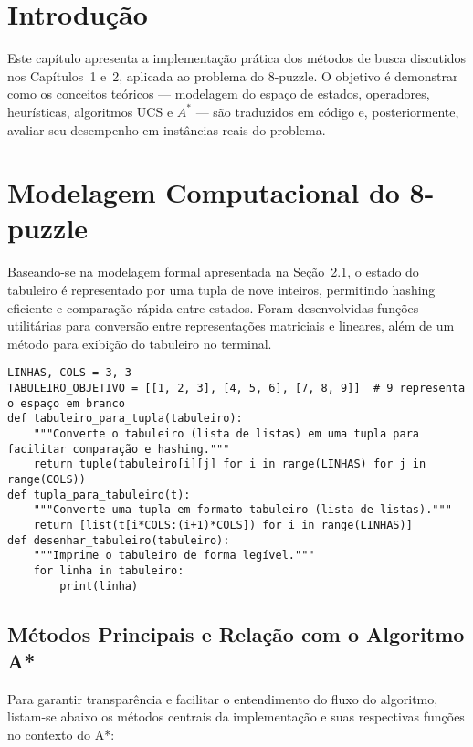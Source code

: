   
\section{Introdução}  
Este capítulo apresenta a implementação prática dos métodos de busca discutidos nos Capítulos~1 e~2, aplicada ao problema do 8-puzzle. O objetivo é demonstrar como os conceitos teóricos — modelagem do espaço de estados, operadores, heurísticas, algoritmos UCS e $A^*$ — são traduzidos em código e, posteriormente, avaliar seu desempenho em instâncias reais do problema.  
  
\section{Modelagem Computacional do 8-puzzle}  
Baseando-se na modelagem formal apresentada na Seção~2.1, o estado do tabuleiro é representado por uma tupla de nove inteiros, permitindo hashing eficiente e comparação rápida entre estados. Foram desenvolvidas funções utilitárias para conversão entre representações matriciais e lineares, além de um método para exibição do tabuleiro no terminal.  
\begin{verbatim}  
LINHAS, COLS = 3, 3  
TABULEIRO_OBJETIVO = [[1, 2, 3], [4, 5, 6], [7, 8, 9]]  # 9 representa o espaço em branco  
def tabuleiro_para_tupla(tabuleiro):  
    """Converte o tabuleiro (lista de listas) em uma tupla para facilitar comparação e hashing."""  
    return tuple(tabuleiro[i][j] for i in range(LINHAS) for j in range(COLS))  
def tupla_para_tabuleiro(t):  
    """Converte uma tupla em formato tabuleiro (lista de listas)."""  
    return [list(t[i*COLS:(i+1)*COLS]) for i in range(LINHAS)]  
def desenhar_tabuleiro(tabuleiro):  
    """Imprime o tabuleiro de forma legível."""  
    for linha in tabuleiro:  
        print(linha)  
\end{verbatim}  
  
\subsection{Métodos Principais e Relação com o Algoritmo A*}  
Para garantir transparência e facilitar o entendimento do fluxo do algoritmo, listam-se abaixo os métodos centrais da implementação e suas respectivas funções no contexto do A*:  
  
